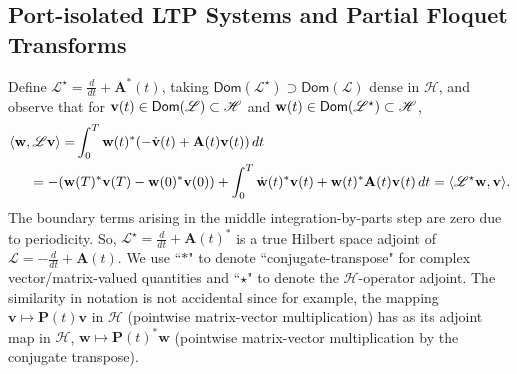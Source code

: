 \documentclass[pdflatex,sn-mathphys-num]{sn-jnl}%
\theoremstyle{thmstyleone}%
\theoremstyle{thmstyletwo}%
\theoremstyle{thmstylethree}%
\def\Bv{{\bf v}}  \def\BV{{\bf V}}
\def\Bw{{\bf w}}  \def\BW{{\bf W}}
\begin{document}
\subsection{Port-isolated {\small LTP} Systems and Partial Floquet Transforms}
\label{se:ltpsys}

Define $\mathscr{L}^{\star}=\frac{d}{dt}+\mathbf{A}^*(t)$, taking 
$\mathsf{Dom}(\mathscr{L}^{\star})\supset\mathsf{Dom}(\mathscr{L})$ dense in  $\mathscr{H}$, and observe that for   $\Bv(t)\in\mathsf{Dom}(\mathscr{L})\subset\mathscr{H}$ and $\Bw(t)\in\mathsf{Dom}(\mathscr{L}^{\star})\subset\mathscr{H}$, 
\[
\begin{aligned}
\langle\Bw,\mathscr{L}\Bv\rangle 
 = & \int_0^T \Bw(t)^*(-\dot{\Bv}(t)+\mathbf{A}(t)\Bv(t))\,dt \\
   = -(\Bw&(T)^*\Bv(T)-\Bw(0)^*\Bv(0))
   +\int_0^T \dot{\Bw}(t)^*\Bv(t)+\Bw(t)^*\mathbf{A}(t)\Bv(t)\,dt =\langle \mathscr{L}^{\star}\Bw, \Bv\rangle.
   \end{aligned}
\]
The boundary terms arising in the middle integration-by-parts step are zero due to periodicity. 
So, $\mathscr{L}^{\star}=\frac{d}{dt}+\mathbf{A}(t)^*$ is a true Hilbert space adjoint of $\mathscr{L}=-\frac{d}{dt}+\mathbf{A}(t)$. We use ``$*$" to denote ``conjugate-transpose" for complex vector/matrix-valued quantities and ``$\star$" to denote the $\mathscr{H}$-operator adjoint.  The similarity in notation is not accidental since for example, the mapping $\mathbf{v}\mapsto \mathbf{P}(t)\mathbf{v}$ in $\mathscr{H}$ (pointwise matrix-vector multiplication) has as its adjoint map in $\mathscr{H}$, $\mathbf{w}\mapsto \mathbf{P}(t)^*\mathbf{w}$ (pointwise matrix-vector multiplication by the conjugate transpose).
\end{document}
